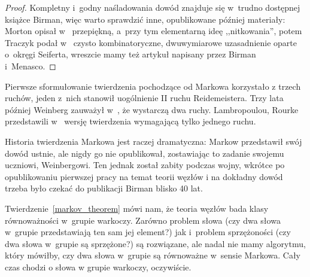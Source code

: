 \begin{proof}
%
%
%
%
    Kompletny i~godny naśladowania dowód znajduje się w~trudno dostępnej książce \cite{birman74} Birman, więc warto sprawdzić inne, opublikowane później materiały:
    Morton opisał w~\cite{mortonhr86} przepiękną, a~przy tym elementarną ideę ,,nitkowania'',
    potem Traczyk podał w~\cite{traczyk98} czysto kombinatoryczne, dwuwymiarowe uzasadnienie oparte o~okręgi Seiferta,
    wreszcie mamy też artykuł \cite{birman02} napisany przez Birman i~Menasco.
\end{proof}

Pierwsze sformułowanie twierdzenia pochodzące od Markowa \cite{markov36} korzystało z trzech ruchów, jeden z~nich stanowił uogólnienie II ruchu Reidemeistera.
Trzy lata później Weinberg zauważył w~\cite{weinberg39}, że wystarczą dwa ruchy.
%
Lambropoulou, Rourke przedstawili w~\cite{lambropoulou97} wersję twierdzenia wymagającą tylko jednego ruchu.
%
%

Historia twierdzenia Markowa jest raczej dramatyczna: Markow przedstawił swój dowód ustnie, ale nigdy go nie opublikował, zostawiając to zadanie swojemu uczniowi, Weinbergowi.
Ten jednak został zabity podczas wojny, wkrótce po opublikowaniu pierwszej pracy na temat teorii węzłów i na dokładny dowód trzeba było czekać do publikacji Birman \cite{birman74} blisko 40 lat.
%

Twierdzenie~\ref{markov_theorem} mówi nam, że teoria węzłów bada klasy równoważności w~grupie warkoczy.
Zarówno problem słowa (czy dwa słowa w~grupie przedstawiają ten sam jej element?) jak i~problem sprzężoności (czy dwa słowa w~grupie są sprzężone?) są rozwiązane, ale nadal nie mamy algorytmu, który mówiłby, czy dwa słowa w~grupie są równoważne w~sensie Markowa.
Cały czas chodzi o słowa w grupie warkoczy, oczywiście.

